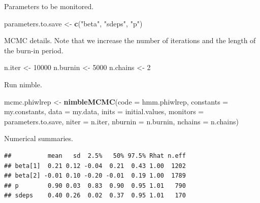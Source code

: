 \documentclass[
  12pt,
]{krantz}
\newenvironment{Shaded}{\begin{snugshade}}{\end{snugshade}}
\newcommand{\AttributeTok}[1]{\textcolor[rgb]{0.13,0.29,0.53}{#1}}
\newcommand{\DecValTok}[1]{\textcolor[rgb]{0.00,0.00,0.81}{#1}}
\newcommand{\FunctionTok}[1]{\textcolor[rgb]{0.13,0.29,0.53}{\textbf{#1}}}
\newcommand{\NormalTok}[1]{#1}
\newcommand{\OtherTok}[1]{\textcolor[rgb]{0.56,0.35,0.01}{#1}}
\newcommand{\StringTok}[1]{\textcolor[rgb]{0.31,0.60,0.02}{#1}}
\begin{document}
Parameters to be monitored.

\begin{Shaded}
\begin{Highlighting}[]
\NormalTok{parameters.to.save }\OtherTok{\textless{}{-}} \FunctionTok{c}\NormalTok{(}\StringTok{"beta"}\NormalTok{, }\StringTok{"sdeps"}\NormalTok{, }\StringTok{"p"}\NormalTok{)}
\end{Highlighting}
\end{Shaded}

MCMC details. Note that we increase the number of iterations and the length of the burn-in period.

\begin{Shaded}
\begin{Highlighting}[]
\NormalTok{n.iter }\OtherTok{\textless{}{-}} \DecValTok{10000}
\NormalTok{n.burnin }\OtherTok{\textless{}{-}} \DecValTok{5000}
\NormalTok{n.chains }\OtherTok{\textless{}{-}} \DecValTok{2}
\end{Highlighting}
\end{Shaded}

Run nimble.

\begin{Shaded}
\begin{Highlighting}[]
\NormalTok{mcmc.phiwlrep }\OtherTok{\textless{}{-}} \FunctionTok{nimbleMCMC}\NormalTok{(}\AttributeTok{code =}\NormalTok{ hmm.phiwlrep, }
                            \AttributeTok{constants =}\NormalTok{ my.constants,}
                            \AttributeTok{data =}\NormalTok{ my.data,              }
                            \AttributeTok{inits =}\NormalTok{ initial.values,}
                            \AttributeTok{monitors =}\NormalTok{ parameters.to.save,}
                            \AttributeTok{niter =}\NormalTok{ n.iter,}
                            \AttributeTok{nburnin =}\NormalTok{ n.burnin, }
                            \AttributeTok{nchains =}\NormalTok{ n.chains)}
\end{Highlighting}
\end{Shaded}

Numerical summaries.

\begin{verbatim}
##          mean   sd  2.5%   50% 97.5% Rhat n.eff
## beta[1]  0.21 0.12 -0.04  0.21  0.43 1.00  1202
## beta[2] -0.01 0.10 -0.20 -0.01  0.19 1.00  1789
## p        0.90 0.03  0.83  0.90  0.95 1.01   790
## sdeps    0.40 0.26  0.02  0.37  0.95 1.01   170
\end{verbatim}
\end{document}
